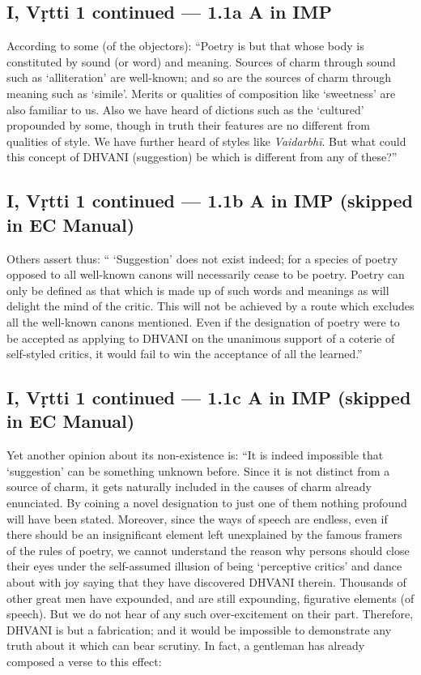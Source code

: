 \documentclass[12pt]{book}
\begin{document}
\subsection{I, Vṛtti 1 continued --- 1.1a A in IMP}

According to some (of the objectors): ``Poetry is but
that whose body is constituted by sound (or word) and meaning.
Sources of charm through sound such as `alliteration' are well-known; and so are the sources of charm through meaning such
as `simile'. Merits or qualities of composition like `sweetness'
are also familiar to us. Also we have heard of dictions such as
the `cultured' propounded by some, though in truth their features
are no different from qualities of style. We have further heard
of styles like \textit{Vaidarbhī}. But what could this concept of DHVANI
(suggestion) be which is different from any of these?”


\subsection{I, Vṛtti 1 continued --- 1.1b A in IMP (skipped in EC Manual)}

Others assert thus: `` `Suggestion' does not exist indeed;
for a species of poetry opposed to all well-known canons will
necessarily cease to be poetry. Poetry can only be defined as
that which is made up of such words and meanings as will delight
the mind of the critic. This will not be achieved by a route which
excludes all the well-known canons mentioned. Even if the
designation of poetry were to be accepted as applying to DHVANI on
the unanimous support of a coterie of self-styled critics, it would
fail to win the acceptance of all the learned.''


\subsection{I, Vṛtti 1 continued --- 1.1c A in IMP (skipped in EC Manual)}

Yet another opinion about its non-existence is: ``It is
indeed impossible that `suggestion' can be something unknown
before. Since it is not distinct from a source of charm, it gets
naturally included in the causes of charm already enunciated.
By coining a novel designation to just one of them nothing
profound will have been stated. Moreover, since the ways
of speech are endless, even if there should be an insignificant
element left unexplained by the famous framers of the rules of
poetry, we cannot understand the reason why persons should
close their eyes under the self-assumed illusion of being `perceptive
critics' and dance about with joy saying that they have discovered DHVANI therein. Thousands of other great men
have expounded, and are still expounding, figurative elements
(of speech). But we do not hear of any such over-excitement
on their part. Therefore, DHVANI is but a fabrication; and it
would be impossible to demonstrate any truth about it which can
bear scrutiny. In fact, a gentleman has already composed a
verse to this effect:
\end{document}

